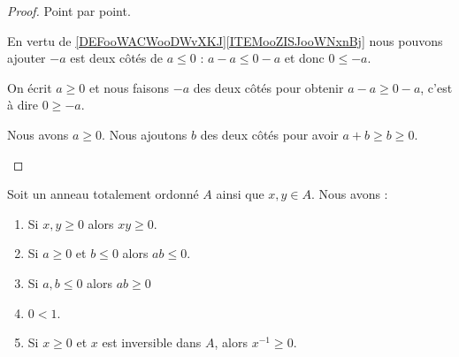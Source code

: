 \begin{proof}
	Point par point.
	\begin{subproof}
		En vertu de \ref{DEFooWACWooDWvXKJ}\ref{ITEMooZISJooWNxnBj} nous pouvons ajouter \( -a\) est deux côtés de \( a\leq 0\) : \( a-a\leq 0-a\) et donc \( 0\leq -a\).

		On écrit \( a\geq 0\) et nous faisons \( -a\) des deux côtés pour obtenir \( a-a\geq 0-a\), c'est à dire \( 0\geq -a\).

		Nous avons \( a\geq 0\). Nous ajoutons \( b\) des deux côtés pour avoir \( a+b\geq b\geq 0\).
	\end{subproof}
\end{proof}


\begin{lemma}        \label{LEMooXJTAooZauchx}
	Soit un anneau totalement ordonné \( A\) ainsi que \( x,y\in A\). Nous avons :
	\begin{enumerate}
		\item		\label{ITEMooHESRooKrDult}
		      Si \( x,y\geq 0\) alors \( xy\geq 0\).
		\item		\label{ITEMooNLAQooHtERZJ}
		      Si \( a\geq 0\) et \( b\leq 0\) alors \( ab\leq 0\).
		\item		\label{ITEMooDZUJooVWuLbD}
		      Si \( a,b\leq 0\) alors \( ab\geq 0\)
		\item       	\label{ITEMooRGYAooCUIfss}
		      \( 0<1\).
		\item       	\label{ITEMooMRNHooLglPKn}
		      Si \( x\geq 0\) et \( x \) est inversible dans \( A \), alors \( x^{-1}\geq 0\).
	\end{enumerate}
\end{lemma}

